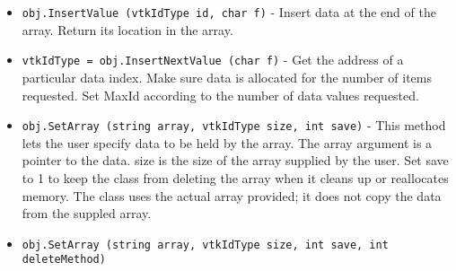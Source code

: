 \begin{itemize}
\item  \verb|obj.InsertValue (vtkIdType id, char f)| -  Insert data at the end of the array. Return its location in the array.

\item  \verb|vtkIdType = obj.InsertNextValue (char f)| -  Get the address of a particular data index. Make sure data is allocated
 for the number of items requested. Set MaxId according to the number of
 data values requested.

\item  \verb|obj.SetArray (string array, vtkIdType size, int save)| -  This method lets the user specify data to be held by the array.  The
 array argument is a pointer to the data.  size is the size of
 the array supplied by the user.  Set save to 1 to keep the class
 from deleting the array when it cleans up or reallocates memory.
 The class uses the actual array provided; it does not copy the data
 from the suppled array. 

\item  \verb|obj.SetArray (string array, vtkIdType size, int save, int deleteMethod)|

\end{itemize}
